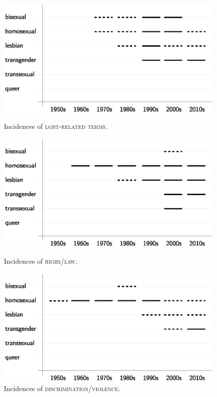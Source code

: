 \documentclass[10pt,a4paper,twocolumn]{scrartcl}
\begin{document}
\begin{figure}
\begin{minipage}{0.48\textwidth}
\includegraphics[width=\columnwidth]{figures/topic_lgbt}
\caption{Incidences of \textsc{lgbt-related terms}.} \label{fig:topic_lgbt}

\includegraphics[width=\columnwidth]{figures/topic_rights}
\caption{Incidences of \textsc{righs/law}.} \label{fig:topic_rigths}

\includegraphics[width=\columnwidth]{figures/topic_violence}
\caption{Incidences of \textsc{discrimination/violence}.} \label{fig:topic_violence}


\end{minipage}
\end{figure}
\end{document}

